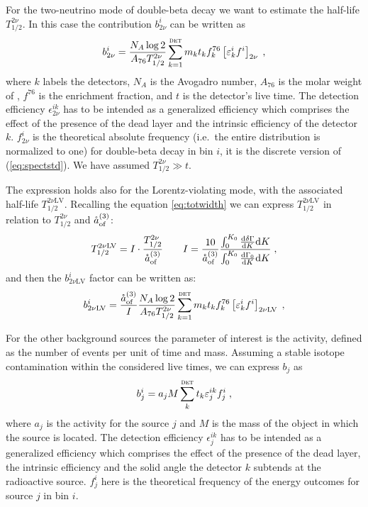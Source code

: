 \marginnote{$2\nbb$} For the two-neutrino mode of double-beta decay we want to estimate the half-life $T_{1/2}^{2\nu}$. In this case the contribution $b_{2\nu}^i$ can be written as
\begin{equation}b_{2\nu}^i=\frac{N_A\log2}{A_{76}T_{1/2}^{2\nu}}\sum_{k=1}^\textsc{det}m_kt_kf^{76}_k\left[\epsilon^i_kf^i\right]_{2\nu}\;,\end{equation}
where $k$ labels the detectors, $N_A$ is the Avogadro number, $A_{76}$ is the molar weight of , $f^{76}$ is the enrichment fraction, and $t$ is the detector's live time. The detection efficiency $\epsilon_{2\nu}^{ik}$ has to be intended as a generalized efficiency which comprises the effect of the presence of the dead layer and the intrinsic efficiency of the detector $k$. $f_{2\nu}^i$ is the theoretical absolute frequency (i.e.~the entire distribution is normalized to one) for double-beta decay in bin $i$, it is the discrete version of (\ref{eq:spectstd}). We have assumed $T_{1/2}^{2\nu}\gg t$.

The expression holds also for the Lorentz-violating mode, with the associated half-life $T_{1/2}^{2\nu\text{LV}}$. Recalling the equation \ref{eq:totwidth} we can express $T_{1/2}^{2\nu\text{LV}}$ in relation to $T_{1/2}^{2\nu}$ and $\aof$:
\begin{equation}T_{1/2}^{2\nu\text{LV}}=I\cdot\frac{T_{1/2}^{2\nu}}{\aof}\qquad I=\frac{10}{\aof}\frac{\int_0^{K_0}\frac{\text{d}\delta\Gamma}{\text{d}K}\text{d}K}{\int_0^{K_0}\frac{\text{d}\Gamma_0}{\text{d}K}\text{d}K}\;,\end{equation}
and then the $b_{2\nu\text{LV}}^i$ factor can be written as:
\begin{equation}b_{2\nu\text{LV}}^i=\frac{\aof}{I}\frac{N_A\log2}{A_{76}T_{1/2}^{2\nu}}\sum_{k=1}^\textsc{det}m_kt_kf^{76}_k\left[\epsilon^i_kf^i\right]_{2\nu\text{LV}}\;,\end{equation}

 For the other background sources the parameter of interest is the activity, defined as the number of events per unit of time and mass. Assuming a stable isotope contamination within the considered live times, we can express $b_j$ as
\begin{equation}b_j^i=a_jM\sum_k^\textsc{det}t_k\epsilon_j^{ik}f_j^i\;,\label{eq:extsources}\end{equation}
where $a_j$ is the activity for the source $j$ and $M$ is the mass of the object in which the source is located. The detection efficiency $\epsilon_j^{ik}$ has to be intended as a generalized efficiency which comprises the effect of the presence of the dead layer, the intrinsic efficiency and the solid angle the detector $k$ subtends at the radioactive source. $f_j^i$ here is the theoretical frequency of the energy outcomes for source $j$ in bin $i$.

